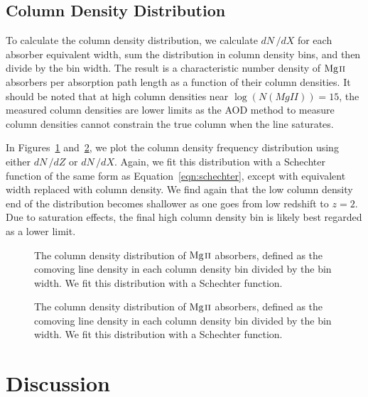 \documentclass[iop,apj,numberedappendix,appendixfloats,twocolappendix]{emulateapj}
\begin{document}
\subsection{Column Density Distribution}
\label{sec:logndistro}

To calculate the column density distribution, we calculate $dN\,/dX$ for each absorber equivalent width, sum the distribution in column density bins, and then divide by the bin width. The result is a characteristic number density of ${\hbox{{\rm Mg}\kern 0.1em{\sc ii}}}$ absorbers per absorption path length as a function of their column densities. It should be noted that at high column densities near $\log (N(MgII)) = 15$, the measured column densities are lower limits as the AOD method to measure column densities cannot constrain the true column when the line saturates.

In Figures~\ref{fig:logndistrodndz} and~\ref{fig:logndistrodndx}, we plot the column density frequency distribution using either $dN\,/dZ$ or $dN\,/dX$. Again, we fit this distribution with a Schechter function of the same form as Equation~\ref{eqn:schechter}, except with equivalent width replaced with column density. We find again that the low column density end of the distribution becomes shallower as one goes from low redshift to $z = 2$. Due to saturation effects, the final high column density bin is likely best regarded as a lower limit. 

\begin{figure*}[bth]
\caption{The column density distribution of ${\hbox{{\rm Mg}\kern 0.1em{\sc ii}}}$ absorbers, defined as the comoving line density in each column density bin divided by the bin width. We fit this distribution with a Schechter function.}
\label{fig:logndistrodndz}
\end{figure*}

\begin{figure*}[bth]
\caption{The column density distribution of ${\hbox{{\rm Mg}\kern 0.1em{\sc ii}}}$ absorbers, defined as the comoving line density in each column density bin divided by the bin width. We fit this distribution with a Schechter function.}
\label{fig:logndistrodndx}
\end{figure*}


\section{Discussion}
\label{sec:discussion}
\end{document}
